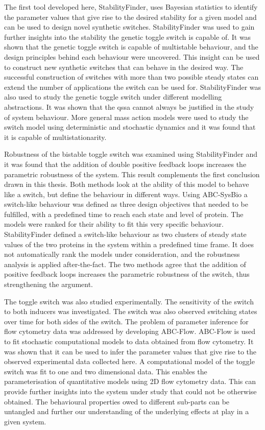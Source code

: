The first tool developed here, StabilityFinder, uses Bayesian statistics to identify the parameter values that give rise to the desired stability for a given model and can be used to design novel synthetic switches. StabilityFinder was used to gain further insights into the stability the genetic toggle switch is capable of. It was shown that the genetic toggle switch is capable of multistable behaviour, and the design principles behind each behaviour were uncovered. This insight can be used to construct new synthetic switches that can behave in the desired way. The successful construction of switches with more than two possible steady states can extend the number of applications the switch can be used for. StabilityFinder was also used to study the genetic toggle switch under different modelling abstractions. It was shown that the \acrshort{qssa} cannot always be justified in the study of system behaviour. More general mass action models were used to study the switch model using deterministic and stochastic dynamics and it was found that it is capable of multistationarity. 

Robustness of the bistable toggle switch was examined using StabilityFinder and it was found that the addition of double positive feedback loops  increases the parametric robustness of the system. This result complements the first conclusion drawn in this thesis. Both methods look at the ability of this model to behave like a switch, but define the behaviour in different ways. Using ABC-SysBio a switch-like behaviour was defined as three design objectives that needed to be fulfilled, with a predefined time to reach each state and level of protein. The models were ranked for their ability to fit this very specific behaviour. StabilityFinder defined a switch-like behaviour as two clusters of steady state values of the two proteins in the system within a predefined time frame. It does not automatically rank the models under consideration, and the robustness analysis is applied after-the-fact. The two methods agree that the addition of positive feedback loops increases the parametric robustness of the switch, thus strengthening the argument.  

The toggle switch was also studied experimentally. The sensitivity of the switch to both inducers was investigated. The switch was also observed switching states over time for both sides of the switch. The problem of parameter inference for flow cytometry data was addressed by developing ABC-Flow.  ABC-Flow is used to fit stochastic computational models to data obtained from flow cytometry. It was shown that it can be used to infer the parameter values that give rise to the observed experimental data collected here. A computational model of the toggle switch was fit to one and two dimensional data. This enables the parameterisation of quantitative models using 2D flow cytometry data. This can provide further insights into the system under study that could not be otherwise obtained. The behavioural properties owed to different sub-parts can be untangled and further our understanding of the underlying effects at play in a given system.

